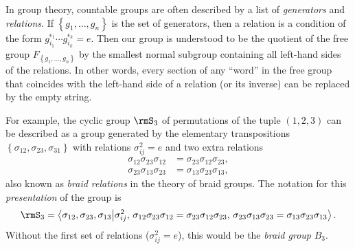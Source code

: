 \begin{rem}
In group theory, countable groups are often described
by a list of \emph{generators} and \emph{relations}. If $\left\{ g_{1},\ldots,g_{n}\right\} $
is the set of generators, then a relation is a condition of the form
$g_{i_{1}}^{\epsilon_{1}}\cdots g_{i_{k}}^{\epsilon_{k}}=e$. Then
our group is understood to be the quotient of the free group $F_{\left\{ g_1,\ldots,g_n\right\} }$
by the smallest normal subgroup containing all left-hand sides of the
relations. In other words, every section of any ``word'' in the
free group that coincides with the left-hand side of a relation (or
its inverse) can be replaced by the empty string.

For example, the cyclic group $\rmS_{3}$ of permutations of the tuple $(1,2,3) $
can be described as a group generated by the elementary transpositions
$\left\{ \sigma_{12},\sigma_{23},\sigma_{31}\right\} $ with relations
$\sigma_{ij}^{2}=e$ and two extra relations
\begin{align}
\sigma_{12}\sigma_{23}\sigma_{12} & =\sigma_{23}\sigma_{12}\sigma_{23},\nonumber \\
\sigma_{23}\sigma_{13}\sigma_{23} & =\sigma_{13}\sigma_{23}\sigma_{13},
\end{align}
also known as \emph{braid relations} in the theory of braid groups.
The notation for this \emph{presentation} of the group is 
\begin{equation}
\rmS_{3}=\left\langle \sigma_{12},\sigma_{23},\sigma_{13}\middle|\sigma_{ij}^{2},\,\sigma_{12}\sigma_{23}\sigma_{12}=\sigma_{23}\sigma_{12}\sigma_{23},\,\sigma_{23}\sigma_{13}\sigma_{23}=\sigma_{13}\sigma_{23}\sigma_{13}\right\rangle .
\end{equation}
Without the first set of relations ($\sigma_{ij}^{2}=e$), this would
be the \emph{braid group} $B_{3}$.
\end{rem}
%
